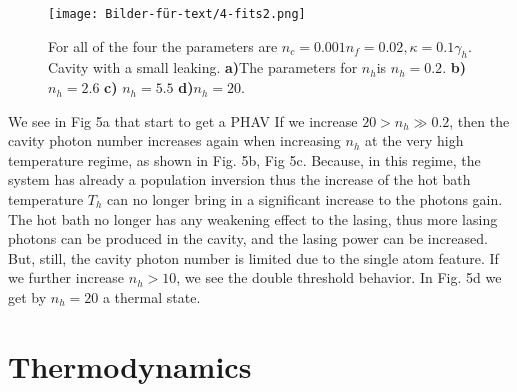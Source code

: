 \documentclass[12pt,a4paper]{article}
\begin{document}
\begin{figure}[h!]
\centering
\texttt{[image: Bilder-für-text/4-fits2.png]}
\caption{For all of the four the parameters are $n_c=0.001 n_f=0.02,\kappa=0.1\gamma_h$. Cavity with a small leaking.
\textbf{a)}The parameters for $n_h$is $n_h=0.2 $.
\textbf{b)}$ n_h=2.6$ 
\textbf{c)} $ n_h=5.5$ 
\textbf{d)}$ n_h=20$. 
}
\end{figure}
\newpage
We see in Fig 5a that start to get a PHAV
If we increase  $20>n_h \gg 0.2 $,
then the cavity photon number increases again when increasing $n_h$ at the very
high temperature regime, as shown in Fig. 5b, Fig 5c. Because,
in this regime, the system has already a population inversion
thus the increase of the hot bath temperature $T_h$
can no longer bring in a significant increase to the photons gain.
The hot bath no longer has
any weakening effect to the lasing, thus more lasing photons
can be produced in the cavity, and the lasing power can be
increased. But, still, the cavity photon number is limited due to
the single atom feature.
If we further increase  $n_h >10$, we see the double threshold behavior. 
In Fig. 5d we get by $n_h=20$ a thermal state.
\section{Thermodynamics}
\end{document}
